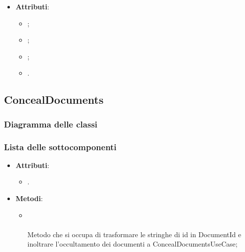 \documentclass[10pt, a4paper]{article}
\begin{document}
\label{PostgresMessageDettaglio}
\begin{itemize}
    \item \textbf{Attributi}:
    \begin{itemize}
        \item {};
        \item {};
        \item {};
        \item {}.
    \end{itemize}
\end{itemize}


\subsection{ConcealDocuments}
\subsubsection{Diagramma delle classi}
\subsubsection{Lista delle sottocomponenti}

\label{ConcealDocumentsControllerDettaglio}
\begin{itemize}
    \item \textbf{Attributi}:
    \begin{itemize}
        \item {}.
    \end{itemize}
    \item \textbf{Metodi}:
    \begin{itemize}
        \item {}\\ \\
        Metodo che si occupa di trasformare le stringhe di id in DocumentId e inoltrare l'occultamento dei documenti a ConcealDocumentsUseCase;
    \end{itemize}
\end{itemize}
\end{document}

